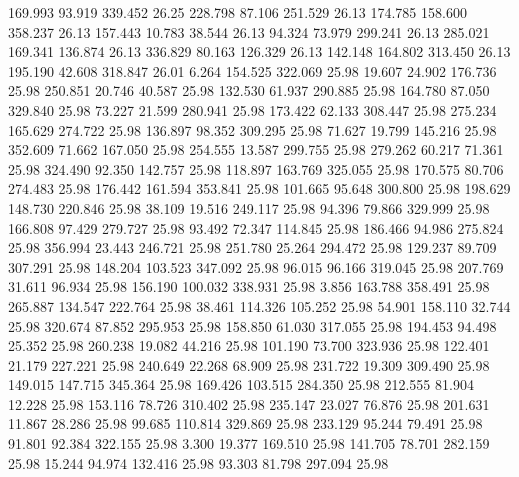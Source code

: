  169.993   93.919  339.452        26.25
 228.798   87.106  251.529        26.13
 174.785  158.600  358.237        26.13
 157.443   10.783   38.544        26.13
  94.324   73.979  299.241        26.13
 285.021  169.341  136.874        26.13
 336.829   80.163  126.329        26.13
 142.148  164.802  313.450        26.13
 195.190   42.608  318.847        26.01
   6.264  154.525  322.069        25.98
  19.607   24.902  176.736        25.98
 250.851   20.746   40.587        25.98
 132.530   61.937  290.885        25.98
 164.780   87.050  329.840        25.98
  73.227   21.599  280.941        25.98
 173.422   62.133  308.447        25.98
 275.234  165.629  274.722        25.98
 136.897   98.352  309.295        25.98
  71.627   19.799  145.216        25.98
 352.609   71.662  167.050        25.98
 254.555   13.587  299.755        25.98
 279.262   60.217   71.361        25.98
 324.490   92.350  142.757        25.98
 118.897  163.769  325.055        25.98
 170.575   80.706  274.483        25.98
 176.442  161.594  353.841        25.98
 101.665   95.648  300.800        25.98
 198.629  148.730  220.846        25.98
  38.109   19.516  249.117        25.98
  94.396   79.866  329.999        25.98
 166.808   97.429  279.727        25.98
  93.492   72.347  114.845        25.98
 186.466   94.986  275.824        25.98
 356.994   23.443  246.721        25.98
 251.780   25.264  294.472        25.98
 129.237   89.709  307.291        25.98
 148.204  103.523  347.092        25.98
  96.015   96.166  319.045        25.98
 207.769   31.611   96.934        25.98
 156.190  100.032  338.931        25.98
   3.856  163.788  358.491        25.98
 265.887  134.547  222.764        25.98
  38.461  114.326  105.252        25.98
  54.901  158.110   32.744        25.98
 320.674   87.852  295.953        25.98
 158.850   61.030  317.055        25.98
 194.453   94.498   25.352        25.98
 260.238   19.082   44.216        25.98
 101.190   73.700  323.936        25.98
 122.401   21.179  227.221        25.98
 240.649   22.268   68.909        25.98
 231.722   19.309  309.490        25.98
 149.015  147.715  345.364        25.98
 169.426  103.515  284.350        25.98
 212.555   81.904   12.228        25.98
 153.116   78.726  310.402        25.98
 235.147   23.027   76.876        25.98
 201.631   11.867   28.286        25.98
  99.685  110.814  329.869        25.98
 233.129   95.244   79.491        25.98
  91.801   92.384  322.155        25.98
   3.300   19.377  169.510        25.98
 141.705   78.701  282.159        25.98
  15.244   94.974  132.416        25.98
  93.303   81.798  297.094        25.98
